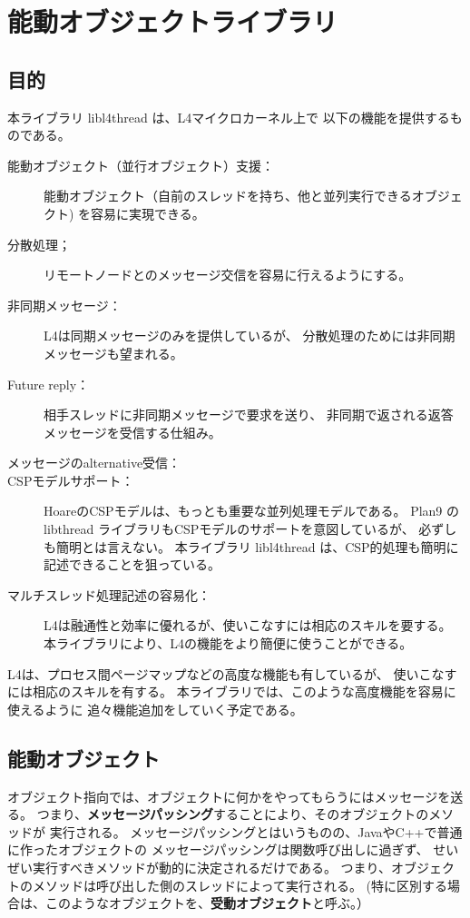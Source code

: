 \documentclass{jarticle}
\begin{document}
\section{能動オブジェクトライブラリ }

\subsection{目的}

本ライブラリ libl4thread は、L4マイクロカーネル上で
以下の機能を提供するものである。

\begin{description}
\item [能動オブジェクト（並行オブジェクト）支援：]
  能動オブジェクト（自前のスレッドを持ち、他と並列実行できるオブジェクト)
  を容易に実現できる。
\item [分散処理；]
  リモートノードとのメッセージ交信を容易に行えるようにする。
\item [非同期メッセージ：]
  L4は同期メッセージのみを提供しているが、
  分散処理のためには非同期メッセージも望まれる。
\item [Future reply：]
  相手スレッドに非同期メッセージで要求を送り、
  非同期で返される返答メッセージを受信する仕組み。
\item[メッセージのalternative受信：]

\item[CSPモデルサポート：]
  HoareのCSPモデルは、もっとも重要な並列処理モデルである。
  Plan9 のlibthread ライブラリもCSPモデルのサポートを意図しているが、
  必ずしも簡明とは言えない。
  本ライブラリ libl4thread は、CSP的処理も簡明に記述できることを狙っている。
\item [マルチスレッド処理記述の容易化：]
  L4は融通性と効率に優れるが、使いこなすには相応のスキルを要する。
  本ライブラリにより、L4の機能をより簡便に使うことができる。
\end{description}

L4は、プロセス間ページマップなどの高度な機能も有しているが、
使いこなすには相応のスキルを有する。
本ライブラリでは、このような高度機能を容易に使えるように
追々機能追加をしていく予定である。



\subsection{能動オブジェクト}

オブジェクト指向では、オブジェクトに何かをやってもらうにはメッセージを送る。
つまり、{\bf メッセージパッシング}することにより、そのオブジェクトのメソッドが
実行される。
メッセージパッシングとはいうものの、JavaやC++で普通に作ったオブジェクトの
メッセージパッシングは関数呼び出しに過ぎず、
せいぜい実行すべきメソッドが動的に決定されるだけである。
つまり、オブジェクトのメソッドは呼び出した側のスレッドによって実行される。
(特に区別する場合は、このようなオブジェクトを、{\bf 受動オブジェクト}と呼ぶ。）
\end{document}
